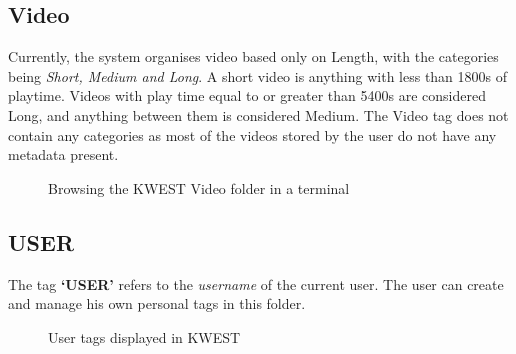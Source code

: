 \subsection{Video}
Currently, the system organises video based only on Length, with the categories being \textit{Short, Medium and Long}. A short video is anything with less than 1800s of playtime. Videos with play time equal to or greater than 5400s are considered Long, and anything between them is considered Medium. The Video tag does not contain any categories as most of the videos stored by the user do not have any metadata present.
\begin{figure}[htb]
\centering
\setlength\fboxsep{0pt}
\setlength\fboxrule{0.5pt}
\caption{Browsing the KWEST Video folder in a terminal}
\label{fig:dfd0}
\end{figure}

\subsection{USER}
The tag \textbf{`USER'} refers to the \textit{username} of the current user. The user can create and manage his own personal tags in this folder.
\begin{figure}[htb]
\centering
\setlength\fboxsep{0pt}
\setlength\fboxrule{0.5pt}
\caption{User tags displayed in KWEST}
\label{fig:dfd0}
\end{figure}


